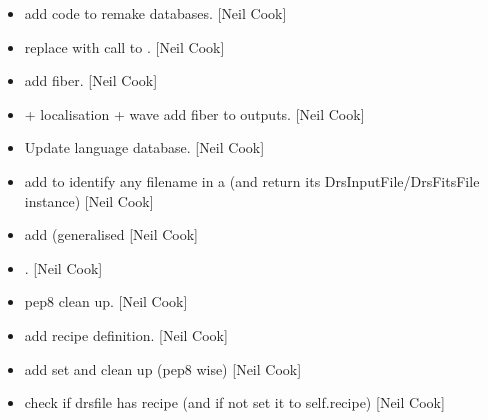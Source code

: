 \documentclass[a4paper,10pt,english]{report}
\begin{document}
\begin{itemize}
\item {} 
 \sphinxhyphen{} add code to remake databases. {[}Neil Cook{]}

\item {} 
 \sphinxhyphen{} replace  with call to
. {[}Neil Cook{]}

\item {} 
 \sphinxhyphen{} add fiber. {[}Neil Cook{]}

\item {} 
 + localisation + wave \sphinxhyphen{} add fiber to
outputs. {[}Neil Cook{]}

\item {} 
Update language database. {[}Neil Cook{]}

\item {} 
 \sphinxhyphen{} add  to identify any filename in a
 (and return its DrsInputFile/DrsFitsFile instance) {[}Neil
Cook{]}

\item {} 
 \sphinxhyphen{} add 
(generalised  {[}Neil Cook{]}

\item {} 
 \sphinxhyphen{}
. {[}Neil Cook{]}

\item {} 
 \sphinxhyphen{} pep8 clean up. {[}Neil Cook{]}

\item {} 
 \sphinxhyphen{} add  recipe
definition. {[}Neil Cook{]}

\item {} 
 \sphinxhyphen{} add  set and clean
up (pep8 wise) {[}Neil Cook{]}

\item {} 
 \sphinxhyphen{} check if drsfile has recipe (and if not set it
to self.recipe) {[}Neil Cook{]}


\end{itemize}
\end{document}
